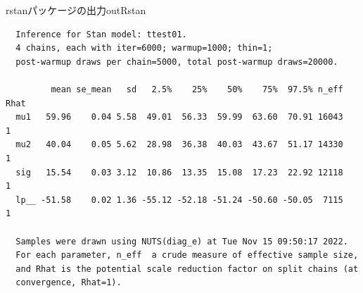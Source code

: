 \begin{SCrstan}{rstanパッケージの出力}{outRstan}
	\begin{verbatim}
  Inference for Stan model: ttest01.
  4 chains, each with iter=6000; warmup=1000; thin=1; 
  post-warmup draws per chain=5000, total post-warmup draws=20000.
  
         mean se_mean   sd   2.5%    25%    50%    75%  97.5% n_eff Rhat
  mu1   59.96    0.04 5.58  49.01  56.33  59.99  63.60  70.91 16043    1
  mu2   40.04    0.05 5.62  28.98  36.38  40.03  43.67  51.17 14330    1
  sig   15.54    0.03 3.12  10.86  13.35  15.08  17.23  22.92 12118    1
  lp__ -51.58    0.02 1.36 -55.12 -52.18 -51.24 -50.60 -50.05  7115    1
  
  Samples were drawn using NUTS(diag_e) at Tue Nov 15 09:50:17 2022.
  For each parameter, n_eff  a crude measure of effective sample size,
  and Rhat is the potential scale reduction factor on split chains (at 
  convergence, Rhat=1).
\end{verbatim}
\end{SCrstan}
